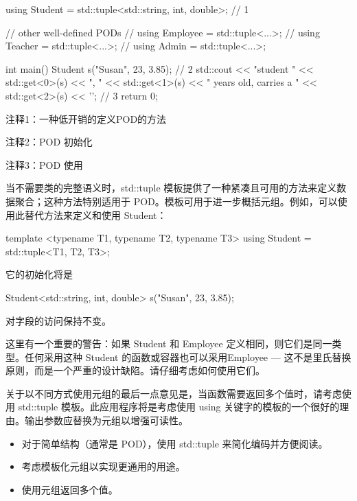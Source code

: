 
\begin{cpp}
using Student = std::tuple<std::string, int, double>; // 1

// other well-defined PODs
// using Employee = std::tuple<...>;
// using Teacher = std::tuple<...>;
// using Admin = std::tuple<...>;

int main() {
  Student s("Susan", 23, 3.85); // 2
  std::cout << "student " << std::get<0>(s) << ", " << std::get<1>(s)
      << " years old, carries a " << std::get<2>(s) << '\n'; // 3
  return 0;
}
\end{cpp}

{\footnotesize
注释1：一种低开销的定义POD的方法

注释2：POD 初始化

注释3：POD 使用
}

当不需要类的完整语义时，std::tuple 模板提供了一种紧凑且可用的方法来定义数据聚合；这种方法特别适用于 POD。模板可用于进一步概括元组。例如，可以使用此替代方法来定义和使用 Student：

\begin{cpp}
template <typename T1, typename T2, typename T3>
using Student = std::tuple<T1, T2, T3>;
\end{cpp}

它的初始化将是

\begin{cpp}
Student<std::string, int, double> s("Susan", 23, 3.85);
\end{cpp}

对字段的访问保持不变。

这里有一个重要的警告：如果 Student 和 Employee 定义相同，则它们是同一类型。任何采用这种 Student 的函数或容器也可以采用Employee — 这不是里氏替换原则，而是一个严重的设计缺陷。请仔细考虑如何使用它们。

关于以不同方式使用元组的最后一点意见是，当函数需要返回多个值时，请考虑使用 std::tuple 模板。此应用程序将是考虑使用 using 关键字的模板的一个很好的理由。输出参数应替换为元组以增强可读性。


\begin{itemize}
\item
对于简单结构（通常是 POD），使用 std::tuple 来简化编码并方便阅读。

\item
考虑模板化元组以实现更通用的用途。

\item
使用元组返回多个值。
\end{itemize}









